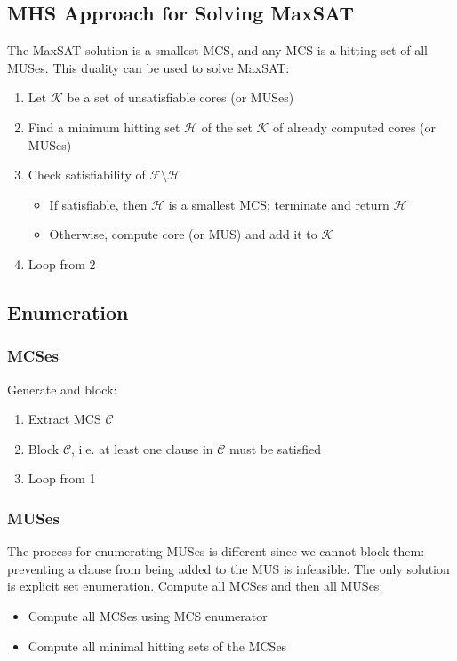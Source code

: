 \documentclass[10pt,a4paper]{report}
\begin{document}
\subsection{MHS Approach for Solving MaxSAT}
The MaxSAT solution is a smallest MCS, and any MCS is a hitting set of all MUSes. This duality can be used to solve MaxSAT:
\begin{enumerate}
    \item Let $\mathcal{K}$ be a set of unsatisfiable cores (or MUSes)
    \item Find a minimum hitting set $\mathcal{H}$ of the set $\mathcal{K}$ of already computed cores (or MUSes)
    \item Check satisfiability of $\mathcal{F} \setminus \mathcal{H}$
    \begin{itemize}
        \item If satisfiable, then $\mathcal{H}$ is a smallest MCS; terminate and return $\mathcal{H}$
        \item Otherwise, compute core (or MUS) and add it to $\mathcal{K}$
    \end{itemize}
    \item Loop from 2
\end{enumerate}
\subsection{Enumeration}
\subsubsection{MCSes}
Generate and block:
\begin{enumerate}
    \item Extract MCS $\mathcal{C}$
    \item Block $\mathcal{C}$, i.e. at least one clause in $\mathcal{C}$ must be satisfied
    \item Loop from 1
\end{enumerate}
\subsubsection{MUSes}
The process for enumerating MUSes is different since we cannot block them: preventing a clause from being added to the MUS is infeasible. The only solution is explicit set enumeration. Compute all MCSes and then all MUSes:
\begin{itemize}
    \item Compute all MCSes using MCS enumerator
    \item Compute all minimal hitting sets of the MCSes
\end{itemize}
\end{document}
